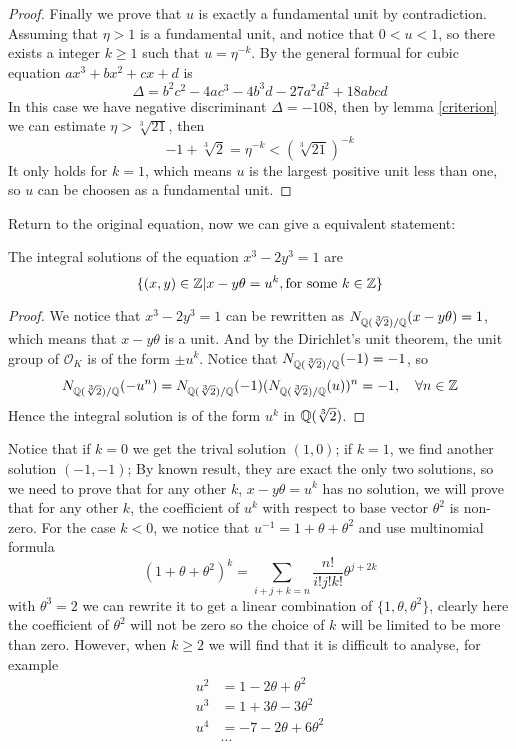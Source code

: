 \begin{proposition}
\begin{proof}
        Finally we prove that \(u\) is exactly a fundamental unit by contradiction. Assuming that \(\eta>1\) is a fundamental unit, and notice that \(0<u<1\), so there exists a integer \(k \geq 1\) such that \(u = \eta^{-k}\). By the general formual for cubic equation \(ax^3+bx^2+cx+d\) is 
        \[\Delta = b^2 c^2 -4ac^3-4b^3d-27a^2d^2+18abcd\]
        In this case we have negative discriminant \(\Delta = -108\), then by lemma \ref{criterion} we can estimate \(\eta > \sqrt[3]{21}\), then 
        \[-1 + \sqrt[3]{2} = \eta^{-k} < (\sqrt[3]{21})^{-k}\]
        It only holds for \(k=1\), which means \(u\) is the largest positive unit less than one, so \(u\) can be choosen as a fundamental unit.
        
    \end{proof}
\end{proposition}

Return to the original equation, now we can give a equivalent statement:
\begin{proposition} \label{equi}
    The integral solutions of the equation \(x^3-2y^3=1\) are
    \[\{(x,y)\in \mathbb{Z}| x-y\theta = u^k, \text{for some } k \in \mathbb{Z}\}\]

    \begin{proof}
        We notice that \(x^3-2y^3 = 1 \) can be rewritten as \(N_{\mathbb{Q}(\sqrt[3]{2}) / \mathbb{Q}}(x-y\theta) = 1\), which means that \(x-y\theta\) is a unit. And by the Dirichlet's unit theorem, the unit group of \(\mathcal{O}_K\) is of the form \(\pm u^k\). Notice that \(N_{\mathbb{Q}(\sqrt[3]{2}) / \mathbb{Q}}(-1) = -1\), so
        \[N_{\mathbb{Q}(\sqrt[3]{2}) / \mathbb{Q}}(-u^n) = N_{\mathbb{Q}(\sqrt[3]{2}) / \mathbb{Q}}(-1)(N_{\mathbb{Q}(\sqrt[3]{2}) / \mathbb{Q}}(u))^n = -1, \quad \forall n \in \mathbb{Z} \]
        Hence the integral solution is of the form \(u^k\) in \(\mathbb{Q}(\sqrt[3]{2})\).
    \end{proof}
\end{proposition}

Notice that if \(k=0\) we get the trival solution \((1,0)\); if \(k=1\), we find another solution \((-1,-1)\); By known result, they are exact the only two solutions, so we need to prove that for any other \(k\), \(x-y\theta = u^k\) has no solution, we will prove that for any other \(k\), the coefficient of \(u^k\) with respect to base vector \(\theta^2\) is non-zero. For the case \(k<0\), we notice that \(u^{-1} = 1+\theta +\theta^2\) and use multinomial formula
\[(1+\theta+ \theta^2)^k = \sum_{i+j+k=n} \frac{n!}{i!j!k!}\theta ^{j+2k}\]
with \(\theta ^3= 2\) we can rewrite it to get a linear combination of \(\{1,\theta,\theta ^2\}\), clearly here the coefficient of \(\theta ^2\) will not be zero so the choice of \(k\) will be limited to be more than zero. However, when \(k \geq  2\) we will find that it is difficult to analyse, for example
\begin{align*}
    u^2 &= 1- 2\theta +\theta^2 \\
    u^3 &= 1+3\theta-3\theta^2 \\
    u^4 &= -7-2\theta+6\theta^2\\
    &...
\end{align*}
 
